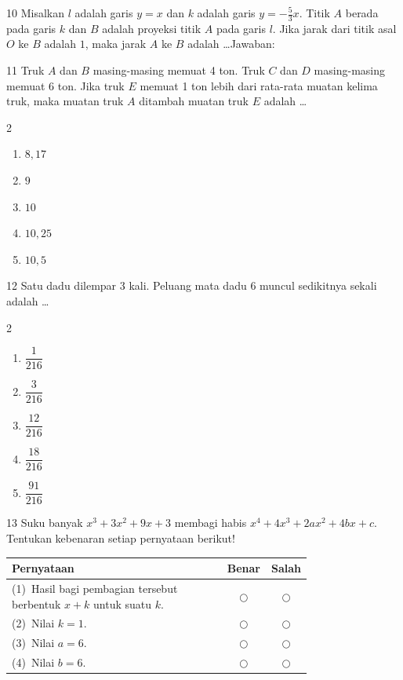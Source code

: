 \documentclass[11pt]{article}
\newenvironment{pilB}{%
  \par\smallskip\begin{multicols}{2}
  \begin{enumerate}[label=(\Alph*),leftmargin=*,itemsep=1pt,topsep=3pt]}%
  {\end{enumerate}\end{multicols}}
\begin{document}
\begin{soal}{10}
Misalkan $l$ adalah garis $y=x$ dan $k$ adalah garis $y=-\tfrac{5}{3}x$.
Titik $A$ berada pada garis $k$ dan $B$ adalah proyeksi titik $A$ pada
garis $l$. Jika jarak dari titik asal $O$ ke $B$ adalah $1$, maka
jarak $A$ ke $B$ adalah \ldots\hfill Jawaban:\enspace\underline{\hspace{3cm}}
\end{soal}


\begin{soal}{11}
Truk $A$ dan $B$ masing-masing memuat 4 ton. Truk $C$ dan $D$
masing-masing memuat 6 ton. Jika truk $E$ memuat 1 ton lebih dari
rata-rata muatan kelima truk, maka muatan truk $A$ ditambah muatan
truk $E$ adalah \ldots
\begin{pilB}
  \item $8{,}17$ \item $9$ \item $10$ \item $10{,}25$ \item $10{,}5$
\end{pilB}
\end{soal}

\begin{soal}{12}
Satu dadu dilempar 3 kali. Peluang mata dadu 6 muncul sedikitnya
sekali adalah \ldots
\begin{pilB}
  \item $\dfrac{1}{216}$ \item $\dfrac{3}{216}$ \item $\dfrac{12}{216}$
  \item $\dfrac{18}{216}$ \item $\dfrac{91}{216}$
\end{pilB}
\end{soal}

\begin{soal}{13}
Suku banyak $x^3+3x^2+9x+3$ membagi habis $x^4+4x^3+2ax^2+4bx+c$.
Tentukan kebenaran setiap pernyataan berikut!

\par\smallskip
{\renewcommand{\arraystretch}{1.4}%
\begin{tabular}{@{}p{0.76\linewidth}cc@{}}
\hline
\textbf{Pernyataan} & \textbf{Benar} & \textbf{Salah}\\
\hline
(1)~Hasil bagi pembagian tersebut berbentuk $x+k$ untuk suatu $k$.
  & $\bigcirc$ & $\bigcirc$\\
(2)~Nilai $k=1$.
  & $\bigcirc$ & $\bigcirc$\\
(3)~Nilai $a=6$.
  & $\bigcirc$ & $\bigcirc$\\
(4)~Nilai $b=6$.
  & $\bigcirc$ & $\bigcirc$\\
\hline
\end{tabular}}
\end{soal}
\end{document}
